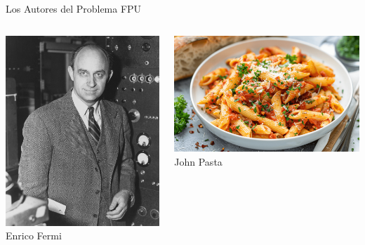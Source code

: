 \begin{frame}{Los Autores del Problema FPU}
    \begin{columns}[T] %
        \begin{column}{0.24\textwidth}
            \centering
            \includegraphics[width=\textwidth]{images/fermi_face.jpg}
            Enrico Fermi
        \end{column}
        
        \begin{column}{0.24\textwidth}
            \centering
            \includegraphics[width=\textwidth]{images/pasta.png}
            John Pasta
        \end{column}
        

\end{columns}
\end{frame}

